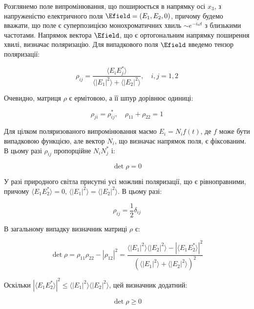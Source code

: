 Розглянемо поле випромінювання, що поширюється в напрямку осі \(x_3\), з напруженістю електричного поля \(\Efield = (E_1, E_2, 0)\), причому будемо
вважати, що поле є суперпозицією монохроматичних хвиль \(\sim e^{-i\omega t}\) з близькими частотами. Напрямок вектора \(\Efield\), що є ортогональним
напрямку поширення хвилі, визначає поляризацію. Для випадкового поля \(\Efield\) введемо тензор поляризації:

\begin{equation}
\rho_{ij} = \frac{\langle E_i E_j^{*} \rangle}{\langle |E_1|^2 \rangle + \langle |E_2|^2 \rangle}, \quad i, j = 1, 2
\label{eq:polarization_tensor}
\end{equation}

Очевидно, матриця \(\rho\) є ермітовою, а її шпур дорівнює одиниці:

\begin{equation*}
\rho_{ji} = \rho_{ij}^{*}, \quad \rho_{11} + \rho_{22} = 1
\end{equation*}

Для цілком поляризованого випромінювання маємо \(E_i = N_i f(t)\), де \(f\) може бути випадковою функцією, але вектор \(N_i\), що визначає напрямок
поля, є фіксованим. В цьому разі \(\rho_{ij}\) пропорційне \(N_i N_j^{*}\) і:

\begin{equation*}
\det \rho = 0
\end{equation*}

У разі природного світла присутні усі можливі поляризації, що є рівноправними, причому \(\langle E_1 E_2^{*} \rangle = 0\), \(\langle |E_1|^2 \rangle =
\langle |E_2|^2 \rangle\). В цьому разі:

\begin{equation*}
\rho_{ij} = \frac{1}{2} \delta_{ij}
\end{equation*}

В загальному випадку визначник матриці \(\rho\) є:

\begin{equation*}
\det \rho = \rho_{11} \rho_{22} - |\rho_{12}|^2 = \frac{\langle |E_1|^2 \rangle \langle |E_2|^2 \rangle - |\langle E_1 E_2^{*} \rangle|^2}{\left(
\langle |E_1|^2 \rangle + \langle |E_2|^2 \rangle \right)^2}
\end{equation*}

Оскільки \(|\langle E_1 E_2^{*} \rangle|^2 \leq \langle |E_1|^2 \rangle \langle |E_2|^2 \rangle\), цей визначник додатний:

\begin{equation*}
\det \rho \geq 0
\end{equation*}

